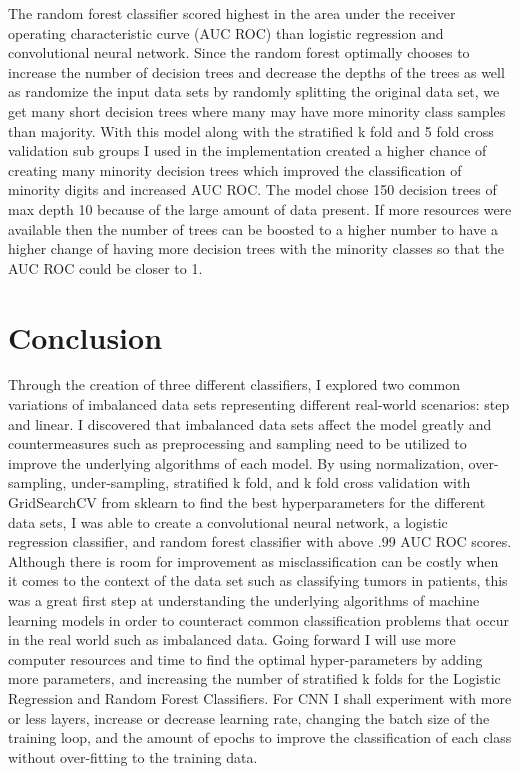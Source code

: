 \documentclass[Dealing with Imbalance in Computer Vision]{IEEEtran}
\begin{document}
The random forest classifier scored highest in the area under the receiver operating characteristic curve (AUC ROC) than logistic regression and convolutional neural network. Since the random forest optimally chooses to increase the number of decision trees and decrease the depths of the trees as well as randomize the input data sets by randomly splitting the original data set, we get many short decision trees where many may have more minority class samples than majority. With this model along with the stratified k fold and 5 fold cross validation sub groups I used in the implementation created a higher chance of creating many minority decision trees which improved the classification of minority digits and increased AUC ROC. The model chose 150 decision trees of max depth 10 because of the large amount of data present.  If more resources were available then the number of trees can be boosted to a higher number to have a higher change of having more decision trees with the minority classes so that the AUC ROC could be closer to 1.

\section{Conclusion}
Through the creation of three different classifiers, I explored two common variations of imbalanced data sets representing different real-world scenarios: step and linear. I discovered that imbalanced data sets affect the model greatly and countermeasures such as preprocessing and sampling need to be utilized to improve the underlying algorithms of each model. By using normalization, over-sampling, under-sampling, stratified k fold, and k fold cross validation with GridSearchCV from sklearn to find the best hyperparameters for the different data sets, I was able to create a convolutional neural network, a logistic regression classifier, and random forest classifier with above .99 AUC ROC scores. Although there is room for improvement as misclassification can be costly when it comes to the context of the data set such as classifying tumors in patients, this was a great first step at understanding the underlying algorithms of machine learning models in order to counteract common classification problems that occur in the real world such as imbalanced data. Going forward I will use more computer resources and time to find the optimal hyper-parameters by adding more parameters, and increasing the number of stratified k folds for the Logistic Regression and Random Forest Classifiers. For CNN I shall experiment with more or less layers, increase or decrease learning rate, changing the batch size of the training loop, and the amount of epochs to improve the classification of each class without over-fitting to the training data.
\end{document}
